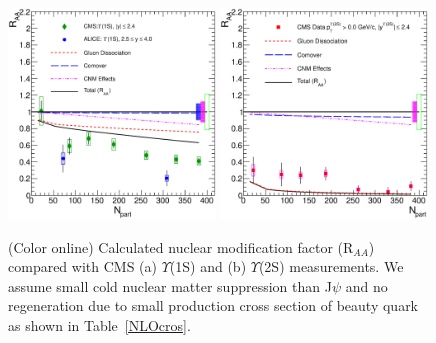 \documentclass[aps,prc,preprint,superscriptaddress,showpacs,showkeys]{revtex4-1}
\begin{document}
\begin{figure}
\includegraphics[width=0.49\textwidth]{Figures/Fig7a_CMS_Y1SRAANPart.eps}
\includegraphics[width=0.49\textwidth]{Figures/Fig7b_CMS_Y2SRAANPart.eps}
\caption{(Color online) Calculated nuclear modification factor (R$_{AA}$) compared with CMS 
(a) $\Upsilon$(1S) and (b) $\Upsilon$(2S) measurements.
 We assume small cold nuclear matter suppression than J$\psi$ and no regeneration due to small 
production cross section of beauty quark as shown in Table~\ref{NLOcros}.}
\label{fig:UpsilonRaa}
\end{figure}




\end{document}
